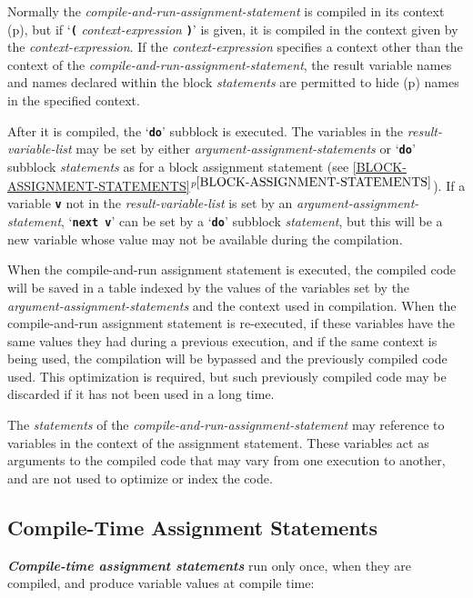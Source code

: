 \documentclass[12pt]{article}
\newcommand{\TT}[1]{{\tt \bfseries #1}}
\newcommand{\ikey}[2]{{\bf \em #1}\index{#2}}
\newcommand{\itemref}[1]{\ref{#1}$^{p\pageref{#1}}$}
\newcommand{\pagref}[1]{p\pageref{#1}}
\begin{document}
Normally the
{\em compile-and-run-assignment-statement} is
compiled in its context (\pagref{CONTEXT}),
but if `\TT{(} {\em context-expression} \TT{)}'
is given, it is compiled in the context given by the
{\em context-expres\-sion}.
If the {\em context-expression}
specifies a context other than the context of the
{\em compile-and-run-assignment-statement}, the result variable names
and names declared within the block {\em statements}
are permitted to hide (\pagref{HIDE})
names in the specified context.

After it is compiled, the `\TT{do}' subblock is executed.
The variables in the {\em result-variable-list}
may be set by either {\em argument-assignment-statements} or
`\TT{do}' subblock {\em statements} as for
a block assignment statement (see \itemref{BLOCK-ASSIGNMENT-STATEMENTS}).
If a variable \TT{v} not in the {\em result-variable-list}
is set by an {\em argument-assignment-statement},
`\TT{next v}' can be set by a `\TT{do}' subblock {\em statement}, but
this will be a new variable whose value may not be available during
the compilation.

When the compile-and-run assignment statement is executed, the compiled
code will be saved in a table indexed by the values of the
variables set by the {\em argument-assignment-statements} and the context
used in compilation.  When the
compile-and-run assignment statement is re-executed, if these
variables have the same values they had during a previous execution,
and if the same context is being used,
the compilation will be bypassed and the previously compiled code used.
This optimization is required, but such previously compiled code
may be discarded if it has not been used in a long time.

The {\em statements} of the {\em compile-and-run-assignment-statement}
may reference to variables in the context of the assignment statement.
These variables act as arguments to the compiled code that may
vary from one execution to another, and are not used to optimize or
index the code.


\subsection{Compile-Time Assignment Statements}
\label{COMPILE-TIME-ASSIGNMENT-STATEMENTS}

\ikey{Compile-time assignment statements}{compile-time assignment statement}
run only once, when they are compiled, and produce variable values
at compile time:
\end{document}
